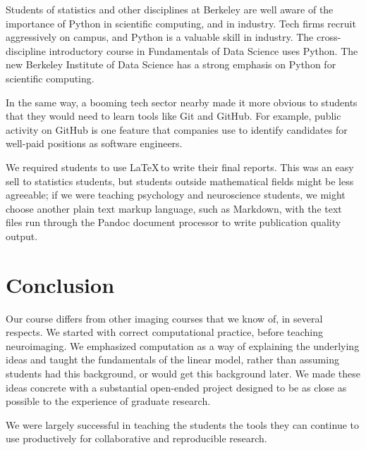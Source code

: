 Students of statistics and other disciplines at Berkeley are well aware of the
importance of Python in scientific computing, and in industry.  Tech firms
recruit aggressively on campus, and Python is a valuable skill in industry.
The cross-discipline introductory course in Fundamentals of Data Science uses
Python. The new Berkeley Institute of Data Science has a strong emphasis
on Python for scientific computing.

In the same way, a booming tech sector nearby made it more obvious to students
that they would need to learn tools like Git and GitHub.
For example, public activity on GitHub is one
feature that companies use to identify candidates for well-paid positions as
software engineers.

We required students to use \LaTeX\,to write their final reports.  This was an
easy sell to statistics students, but students outside mathematical fields
might be less agreeable; if we were teaching psychology and neuroscience
students, we might choose another plain text markup language, such as
Markdown, with the text files run through the Pandoc document processor to
write publication quality output.

\section*{Conclusion}

Our course differs from other imaging courses that we know of, in several
respects.  We started with correct computational practice, before teaching
neuroimaging.  We emphasized computation as a way of explaining the underlying
ideas and taught the fundamentals of the linear model, rather than assuming
students had this background, or would get this background later.
We made these ideas concrete with a substantial open-ended project designed to
be as close as possible to the experience of graduate research.

We were largely successful in teaching the students the tools they can continue
to use productively for collaborative and reproducible research.

